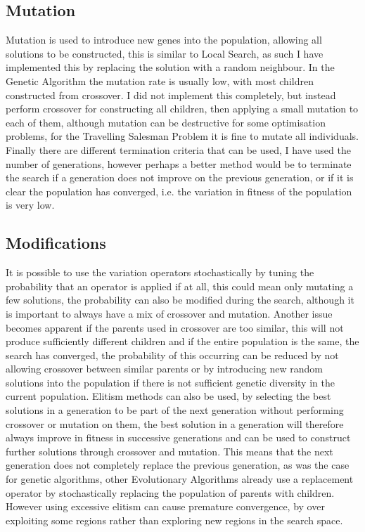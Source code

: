 \documentclass[]{final_report}
\begin{document}
\subsection*{Mutation}

Mutation is used to introduce new genes into the population, allowing all solutions to be constructed, this is similar to Local Search, as such I have implemented this by replacing the solution with a random neighbour. In the Genetic Algorithm the mutation rate is usually low, with most children constructed from crossover. I did not implement this completely, but instead perform crossover for constructing all children, then applying a small mutation to each of them, although mutation can be destructive for some optimisation problems, for the Travelling Salesman Problem it is fine to mutate all individuals. Finally there are different termination criteria that can be used, I have used the number of generations, however perhaps a better method would be to terminate the search if a generation does not improve on the previous generation, or if it is clear the population has converged, i.e. the variation in fitness of the population is very low.

\subsection*{Modifications}

It is possible to use the variation operators stochastically by tuning the probability that an operator is applied if at all, this could mean only mutating a few solutions, the probability can also be modified during the search, although it is important to always have a mix of crossover and mutation. Another issue becomes apparent if the parents used in crossover are too similar, this will not produce sufficiently different children and if the entire population is the same, the search has converged, the probability of this occurring can be reduced by not allowing crossover between similar parents or by introducing new random solutions into the population if there is not sufficient genetic diversity in the current population. Elitism methods can also be used, by selecting the best solutions in a generation to be part of the next generation without performing crossover or mutation on them, the best solution in a generation will therefore always improve in fitness in successive generations and can be used to construct further solutions through crossover and mutation. This means that the next generation does not completely replace the previous generation, as was the case for genetic algorithms, other Evolutionary Algorithms already use a replacement operator by stochastically replacing the population of parents with children\cite{glover:2015}. However using excessive elitism can cause premature convergence, by over exploiting some regions rather than exploring new regions in the search space\cite{siarry:2016}.
\end{document}
